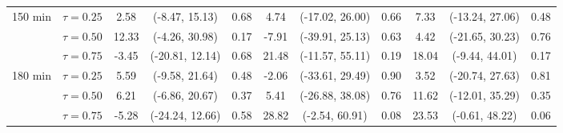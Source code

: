 \begin{table}[ht]
{\begin{tabular}{llccccccccc}
\midrule
\multirow{3}{*}{150 min} & $\tau=0.25$ & 2.58 & (-8.47, 15.13) & 0.68 & 4.74 & (-17.02, 26.00) & 0.66 & 7.33 & (-13.24, 27.06) & 0.48 \\
 & $\tau=0.50$ & 12.33 & (-4.26, 30.98) & 0.17 & -7.91 & (-39.91, 25.13) & 0.63 & 4.42 & (-21.65, 30.23) & 0.76 \\
 & $\tau=0.75$ & -3.45 & (-20.81, 12.14) & 0.68 & 21.48 & (-11.57, 55.11) & 0.19 & 18.04 & (-9.44, 44.01) & 0.17 \\
\midrule
\multirow{3}{*}{180 min} & $\tau=0.25$ & 5.59 & (-9.58, 21.64) & 0.48 & -2.06 & (-33.61, 29.49) & 0.90 & 3.52 & (-20.74, 27.63) & 0.81 \\
 & $\tau=0.50$ & 6.21 & (-6.86, 20.67) & 0.37 & 5.41 & (-26.88, 38.08) & 0.76 & 11.62 & (-12.01, 35.29) & 0.35 \\
 & $\tau=0.75$ & -5.28 & (-24.24, 12.66) & 0.58 & 28.82 & (-2.54, 60.91) & 0.08 & 23.53 & (-0.61, 48.22) & 0.06 \\
\bottomrule
\end{tabular}%
}
\end{table}
